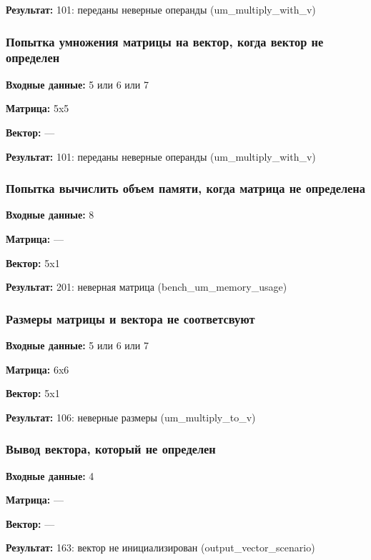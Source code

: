 \documentclass[a4paper,12pt]{extarticle}
\begin{document}
\textbf{Результат: }
101: переданы неверные операнды (um\_multiply\_with\_v)

\subsubsection{Попытка умножения матрицы на вектор, когда вектор не определен}

\textbf{Входные данные: }
5 или 6 или 7

\textbf{Матрица: }
5x5

\textbf{Вектор: }
---

\textbf{Результат: }
101: переданы неверные операнды (um\_multiply\_with\_v)

\subsubsection{Попытка вычислить объем памяти, когда матрица не определена}



\textbf{Входные данные: }
8

\textbf{Матрица: }
---

\textbf{Вектор: }
5x1

\textbf{Результат: }
201: неверная матрица (bench\_um\_memory\_usage)

\subsubsection{Размеры матрицы и вектора не соответсвуют}



\textbf{Входные данные: }
5 или 6 или 7

\textbf{Матрица: }
6x6

\textbf{Вектор: }
5x1

\textbf{Результат: }
106: неверные размеры (um\_multiply\_to\_v)

\subsubsection{Вывод вектора, который не определен}



\textbf{Входные данные: }
4

\textbf{Матрица: }
---

\textbf{Вектор: }
---

\textbf{Результат: }
163: вектор не инициализирован (output\_vector\_scenario)
\end{document}
